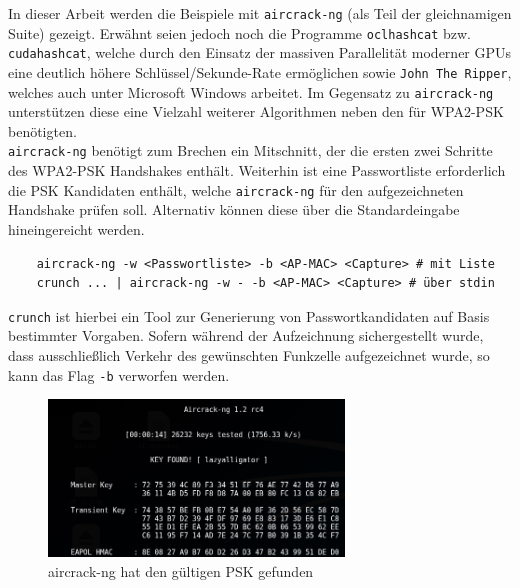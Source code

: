 In dieser Arbeit werden die Beispiele mit \texttt{aircrack-ng} (als Teil der gleichnamigen Suite) gezeigt. Erwähnt seien jedoch noch die Programme \texttt{oclhashcat} bzw. \texttt{cudahashcat}, welche durch den Einsatz der massiven Parallelität moderner GPUs eine deutlich höhere Schlüssel/Sekunde-Rate ermöglichen sowie \texttt{John The Ripper}, welches auch unter Microsoft Windows arbeitet. Im Gegensatz zu \texttt{aircrack-ng} unterstützen diese eine Vielzahl weiterer Algorithmen neben den für WPA2-PSK benötigten.\\

\texttt{aircrack-ng} benötigt zum Brechen ein Mitschnitt, der die ersten zwei Schritte des WPA2-PSK Handshakes enthält.
Weiterhin ist eine Passwortliste erforderlich die PSK Kandidaten enthält, welche \texttt{aircrack-ng} für den aufgezeichneten Handshake prüfen soll. Alternativ können diese über die Standardeingabe hineingereicht werden.
\begin{Verbatim}
	aircrack-ng -w <Passwortliste> -b <AP-MAC> <Capture> # mit Liste
	crunch ... | aircrack-ng -w - -b <AP-MAC> <Capture> # über stdin
\end{Verbatim}
\texttt{crunch} ist hierbei ein Tool zur Generierung von Passwortkandidaten auf Basis bestimmter Vorgaben.
Sofern während der Aufzeichnung sichergestellt wurde, dass ausschließlich Verkehr des gewünschten Funkzelle aufgezeichnet wurde, so kann das Flag \texttt{-b} verworfen werden.

\begin{figure}[ht]
	\centering
	\includegraphics[width=0.7\textwidth]{graphics/aircrack_success}
	\caption[Aircrack-ng]{aircrack-ng hat den gültigen PSK gefunden}
\end{figure}

\FloatBarrier